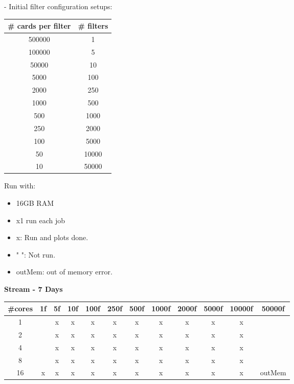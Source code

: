 \documentclass[12pt,a4paper]{article}
\begin{document}
- Initial filter configuration setups:
\begin{table}[H]
\renewcommand{\arraystretch}{1.5} %
\centering
\begin{tabular}{|c|c|}
\hline
\# cards per filter & \# filters \\ \hline
500000   &   1     \\ \hline
100000   &   5     \\ \hline
50000 &   10     \\ \hline
5000  &   100     \\ \hline
2000 &   250    \\ \hline
1000  &   500    \\ \hline
500  &   1000    \\ \hline
250  &   2000    \\ \hline
100  &   5000    \\ \hline
50  &   10000    \\ \hline
10  &   50000    \\ \hline
\end{tabular}
\end{table}

Run with:
\begin{itemize}
    \item 16GB RAM
    \item x1 run each job
\end{itemize}

\begin{itemize}
    \item x: Run and plots done.
    \item " ": Not run.
    \item outMem: out of memory error.
\end{itemize}

\textbf{Stream - 7 Days}
\begin{table}[H]
  \begin{tabular}{|c|c|c|c|c|c|c|c|c|c|c|c|}
  \hline
  \#cores & 1f & 5f & 10f & 100f & 250f & 500f & 1000f & 2000f & 5000f & 10000f & 50000f \\ \hline
  1       &   & x & x & x & x & x & x & x & x & x &        \\ \hline
  2       &   & x & x & x & x & x & x & x & x & x &        \\ \hline
  4       &   & x & x & x & x & x & x & x & x & x &        \\ \hline
  8       &   & x & x & x & x & x & x & x & x & x &        \\ \hline
  16      & x & x & x & x & x & x & x & x & x & x & outMem \\ \hline
  \end{tabular}
\end{table}
\end{document}
